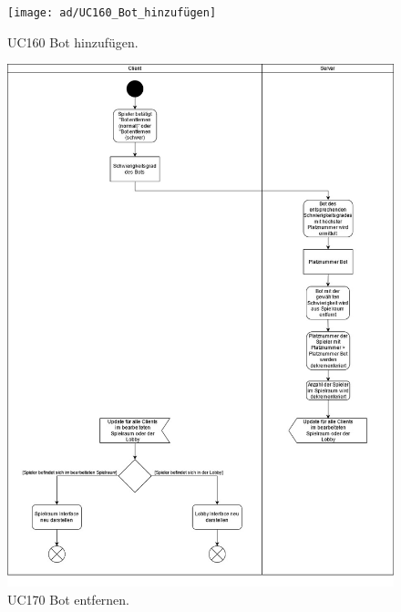 \begin{figure}[h]
	\centering
	\texttt{[image: ad/UC160\_Bot\_hinzufügen]}
	\caption{UC160 Bot hinzufügen.}
\end{figure}

\begin{figure}[h]
	\centering
	\includegraphics[width=\textwidth]{ad/UC170_Bot_entfernen.jpg}
	\caption{UC170 Bot entfernen.}
\end{figure}


